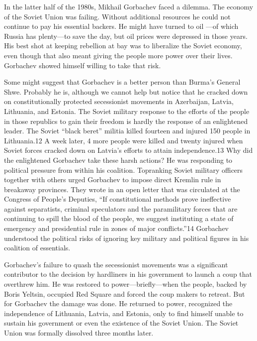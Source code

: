 \documentclass[10pt]{article}
\begin{document}
{\large In the latter half of the 1980s, Mikhail Gorbachev faced a dilemma. The
economy of the Soviet Union was failing. Without additional resources he could
not continue to pay his essential backers. He might have turned to oil ---of
which Russia has plenty---to save the day, but oil prices were depressed in those
years. His best shot at keeping rebellion at bay was to liberalize the Soviet
economy, even though that also meant giving the people more power over their
lives. Gorbachev showed himself willing to take that risk.}

{\large Some might suggest that Gorbachev is a better person than Burma's
General Shwe. Probably he is, although we cannot help but notice that he cracked
down on constitutionally protected secessionist movements in Azerbaijan, Latvia,
Lithuania, and Estonia. The Soviet military response to the efforts of the people
in those republics to gain their freedom is hardly the response of an enlightened
leader. The Soviet ``black beret'' militia killed fourteen and injured 150 people
in Lithuania.12 A week later, 4 more people were killed and twenty injured when
Soviet forces cracked down on Latvia's efforts to attain independence.13 Why did
the enlightened Gorbachev take these harsh actions? He was responding to
political pressure from within his coalition. Topranking Soviet military officers
together with others urged Gorbachev to impose direct Kremlin rule in breakaway
provinces. They wrote in an open letter that was circulated at the Congress of
People's Deputies, ``If constitutional methods prove ineffective against
separatists, criminal speculators and the paramilitary forces that are continuing
to spill the blood of the people, we suggest instituting a state of emergency and
presidential rule in zones of major conflicts.''14 Gorbachev understood the
political risks of ignoring key military and political figures in his coalition
of essentials.}

{\large Gorbachev's failure to quash the secessionist movements was a
significant contributor to the decision by hardliners in his government to launch
a coup that overthrew him. He was restored to power---briefly---when the people,
backed by Boris Yeltsin, occupied Red Square and forced the coup makers to
retreat. But for Gorbachev the damage was done. He returned to power, recognized
the independence of Lithuania, Latvia, and Estonia, only to find himself unable
to sustain his government or even the existence of the Soviet Union. The Soviet
Union was formally dissolved three months later.}
\end{document}
